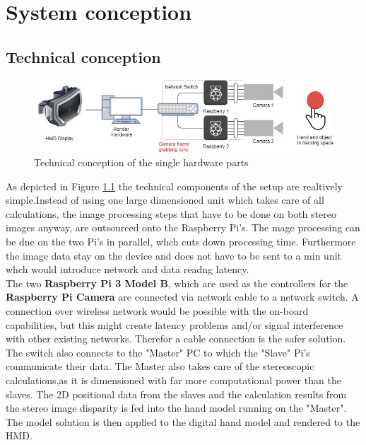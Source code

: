 \chapter{System conception}\section{Technical conception}
\begin{figure}[H]
\includegraphics[width=\textwidth]{images/technical_setup.jpg}
\caption{Technical conception of the single hardware parts}
\label{fig:technical-copnception}
\end{figure} 
As depicted in Figure \ref{fig:technical-copnception} the technical components of the setup are realtively simple.Instead of using one large dimensioned unit which takes care of all calculations, the image processing steps that have to be done on both stereo images anyway, are outsourced onto the Raspberry Pi's.
The mage processing can be dne on the two Pi's in parallel, whch cuts down processing time. Furthermore the image data stay on the device and does not have to be sent to a min unit whch would introduce network and data readng latency.\\
The two \textbf{Raspberry Pi 3 Model B}, which are used as the controllers for the \textbf{Raspberry Pi Camera} are connected via network cable to a network switch. A connection over wireless network would be possible with the on-board capabilities, but this might create latency problems and/or signal interference with other existing networks. Therefor a cable connection is the safer solution.
The switch also connects to the "Master" PC to which the "Slave" Pi's communicate their data. The Master also takes care of the stereoscopic calculations,as it is dimensioned with far more computational power than the slaves. The 2D positional data from the slaves and the calculation results from the stereo image disparity is fed into the hand model running on the "Master". The model solution is then applied to the digital hand model and rendered to the HMD.

